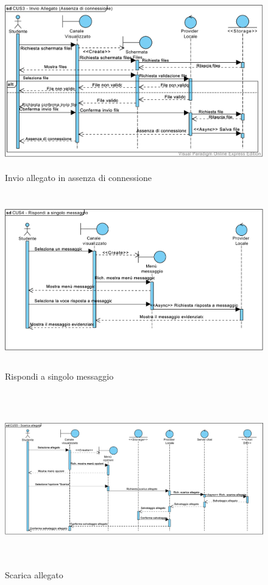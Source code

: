\begin{figure}
	\centering
	\includegraphics[height=3in,width=5in]{imgs/gruppo6/sequence/CUS3_invio_allegato_no_connessione.pdf}
	\caption{Invio allegato in assenza di connessione}
	\label{fig:prova}
\end{figure}

\begin{figure}
	\centering
	\includegraphics[height=3in,width=5in]{imgs/gruppo6/sequence/CUS4_rispondi_a_singolo_messaggio.pdf}
	\caption{Rispondi a singolo messaggio}
	\label{fig:prova}
\end{figure}

\begin{figure}
	\centering
	\includegraphics[height=3in,width=5in]{imgs/gruppo6/sequence/CUS5_scarica_allegato.pdf}
	\caption{Scarica allegato}
	\label{fig:prova}
\end{figure}

